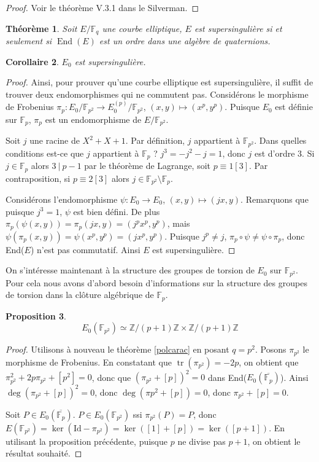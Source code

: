 \documentclass{article}
\theoremstyle{plain}%
\newtheorem{thm}{Théorème}[section]
\newtheorem{prop}[thm]{Proposition}
\newtheorem{cor}[thm]{Corollaire}
\theoremstyle{definition}%
\newcommand{\F}{\mathbb{F}}
\newcommand{\Z}{\mathbb{Z}}
\DeclareMathOperator{\End}{End}
\DeclareMathOperator{\tr}{tr}
\begin{document}
\begin{proof}
  Voir le théorème V.3.1 dans le Silverman.
\end{proof}

\begin{thm}
  Soit $E/\F_q$ une courbe elliptique, $E$ est supersingulière si et seulement si $\End(E)$ est un ordre dans une algèbre de quaternions.
\end{thm}

\begin{cor}
  $E_0$ est supersingulière.
\end{cor}

\begin{proof}
Ainsi, pour prouver qu'une courbe elliptique est supersingulière, il suffit de trouver deux endomorphismes qui ne commutent pas.
Considérons le morphisme de Frobenius $\pi_p : E_0/\F_{p^2} \to E_0^{(p)}/\F_{p^2}$, $(x, y) \mapsto (x^p, y^p)$. 
Puisque $E_0$ est définie sur $\F_{p}$, $\pi_p$ est un endomorphisme de $E/\F_{p^2}$.

Soit $j$ une racine de $X^2 + X + 1$. 
Par définition, $j$ appartient à $\F_{p^2}$. 
Dans quelles conditions est-ce que $j$ appartient à $\F_{p}$ ? 
$j^3 = -j^2 -j = 1$, donc $j$ est d'ordre $3$. 
Si $j\in \F_{p}$ alors $3\ |\ p-1$ par le théorème de Lagrange, soit $p\equiv 1[3]$. 
Par contraposition, si $p \equiv 2 [3]$ alors $j\in\F_{p^2}\setminus\F_{p}$.

Considérons l'endomorphisme $\psi : E_0 \to E_0$, $(x, y) \mapsto (jx, y)$. 
Remarquons que puisque $j^3 = 1$, $\psi$ est bien défini.
De plus $\pi_p(\psi(x, y)) = \pi_p(jx, y) = (j^px^p, y^p)$, mais $\psi(\pi_p(x, y)) = \psi(x^p, y^p) = (jx^p, y^p)$. 
Puisque $j^p\neq j$, $\pi_p \circ \psi \neq \psi \circ \pi_p$, donc End($E$) n'est pas commutatif.
Ainsi $E$ est supersingulière.
\end{proof}

On s'intéresse maintenant à la structure des groupes de torsion de $E_0$ sur $\F_{p^2}$. Pour cela nous avons d'abord besoin d'informations sur la structure des groupes de torsion dans la clôture algébrique de $\F_{p}$.

\begin{prop}
  $$E_0(\F_{p^2}) \simeq \Z/(p+1)\Z \times \Z/(p+1)\Z$$
\end{prop}

\begin{proof}
  Utilisons à nouveau le théorème \ref{polcarac} en posant $q = p^2$. 
  Posons $\pi_{p^2}$ le morphisme de Frobenius.
  En constatant que $\tr(\pi_{p^2}) = -2p$, on obtient que $\pi_{p^2}^2 + 2p\pi_{p^2} + [p^2] = 0$, donc que $\left( \pi_{p^2} + [p] \right) ^2 = 0$ dans End($E_0(\overline{\F_p})$). 
  Ainsi $\deg(\pi_{p^2} + [p])^2 = 0$, donc $\deg(\pi{p^2} + [p]) = 0$, donc $\pi_{p^2} + [p] = 0$.

  Soit $P\in E_0(\overline{\F_{p}})$. $P \in E_0(\F_{p^2})$ ssi $\pi_{p^2}(P) = P$, donc $E(\F_{p^2}) = \ker(\text{Id} - \pi_{p^2}) = \ker([1] + [p]) = \ker([p+1])$.
  En utilisant la proposition précédente, puisque $p$ ne divise pas $p+1$, on obtient le résultat souhaité.
\end{proof}
\end{document}
